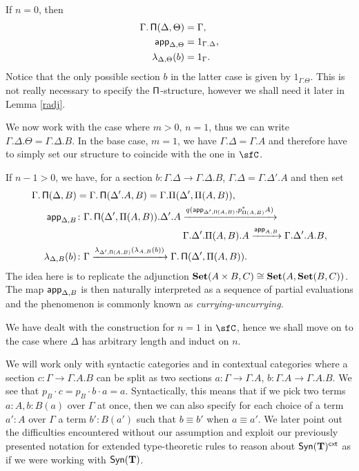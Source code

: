 \begin{construction}[Part 1]
  If $n=0$, then
  \begin{align*}
    \Gamma.\operatorname{\mathsf{\Pi}}(\Delta,\Theta) &=\Gamma, \\
    \operatorname{\mathsf{app}}_{\Delta,\Theta} &=1_{\Gamma.\Delta}, \\
    \lambda_{\Delta,\Theta}(b) &=1_\Gamma.
  \end{align*}
  Notice that the only possible section $b$ in the latter case is given by
  $1_{\Gamma.\Theta}$. This is not really necessary to specify the
  $\operatorname{\mathsf{\Pi}}$-structure, however we shall need it later in Lemma \ref{radj}.

  We now work with the case where $m>0$, $n=1$, thus we can write
  $\Gamma.\Delta.\Theta=\Gamma.\Delta.B$. In the base case, $m=1$, we have
  $\Gamma.\Delta=\Gamma.A$ and therefore have to simply set our structure to
  coincide with the one in $\sfC$.

  If $n-1>0$, we have, for a section
  $b\colon\Gamma.\Delta\rightarrow\Gamma.\Delta.B$,
  $\Gamma.\Delta=\Gamma.\Delta'.A$ and then set
  \begin{align*}
    \Gamma.\operatorname{\mathsf{\Pi}}(\Delta,B)
    &=\Gamma.\operatorname{\mathsf{\Pi}}(\Delta'.A,B)=\Gamma.\Pi(\Delta',\Pi(A,B)), \\
    \operatorname{\mathsf{app}}_{\Delta,B}
    &\colon
    \Gamma.\operatorname{\mathsf{\Pi}}(\Delta',\Pi(A,B)).\Delta'.A
                    \xrightarrow{q(\operatorname{\mathsf{app}}_{\Delta',\operatorname{\mathsf{\Pi}}(A,B)},p^*_{\Pi(A,B)}A)} \\
    &\quad\quad\quad\quad\quad\quad\quad\quad\quad\quad\quad
    \Gamma.\Delta'.\Pi(A,B).A
    \xrightarrow{\operatorname{\mathsf{app}}_{A,B}}
    \Gamma.\Delta'.A.B, \\
    \lambda_{\Delta,B}(b)
    &\colon
    \Gamma
    \xrightarrow{\lambda_{\Delta',\operatorname{\mathsf{\Pi}}(A,B)}(\lambda_{A,B}(b))}
    \Gamma.\operatorname{\mathsf{\Pi}}(\Delta',\Pi(A,B)).
  \end{align*}
  The idea here is to replicate the adjunction $\operatorname{\mathbf{Set}}(A\times
  B,C)\cong\operatorname{\mathbf{Set}}(A,\operatorname{\mathbf{Set}}(B,C))$. The map $\operatorname{\mathsf{app}}_{\Delta,B}$ is then naturally
  interpreted as a sequence of partial evaluations and the phenomenon is
  commonly known as \emph{currying-uncurrying}.
\end{construction}

  We have dealt with the construction for $n=1$ in $\sfC$, hence we shall move
  on to the case where $\Delta$ has arbitrary length and induct on $n$.

We will work only with syntactic categories and in contextual categories where a
section $c\colon\Gamma\rightarrow\Gamma.A.B$ can be split as
two sections $a\colon\Gamma\rightarrow\Gamma.A$,
$b\colon\Gamma.A\rightarrow\Gamma.A.B$.
We see that $p_B\cdot c=p_B\cdot b\cdot a=a$. Syntactically, this means that if
we pick two terms $a:A,b:B(a)$ over $\Gamma$ at once, then we can also
specify for each choice of a term $a':A$ over $\Gamma$ a term $b':B(a')$ such
that $b\equiv b'$ when $a\equiv a'$. We later point out the
difficulties encountered without our assumption and exploit our previously
presented notation for extended type-theoretic rules to reason about
$\mathsf{Syn}(\mathbf{T})^{\operatorname{\mathsf{cxt}}}$ as if we were working with $\mathsf{Syn}(\mathbf{T})$.

